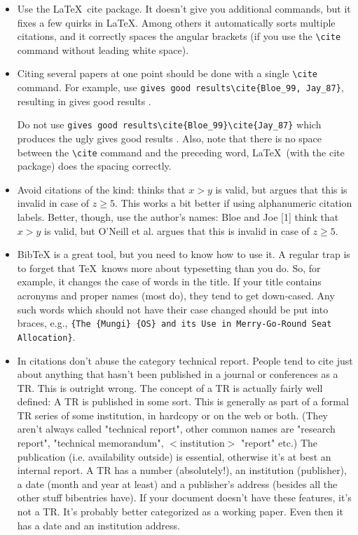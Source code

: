 \documentclass[a4paper,twoside, openright,12pt]{report}
\begin{document}
\begin{itemize}
\item Use the \LaTeX~cite package. It doesn't give you additional commands, but it fixes a few quirks in \LaTeX. Among others it automatically sorts multiple citations, and it correctly spaces the angular brackets (if you use the \verb|\cite| command without leading white space).

\item Citing several papers at one point should be done with a single \verb|\cite| command. For example, use \verb|gives good results\cite{Bloe_99, Jay_87}|, resulting in gives good results \cite{Bloe_99, Jay_87}. 

Do not use \verb|gives good results\cite{Bloe_99}\cite{Jay_87}| which produces the ugly gives good results \cite{Bloe_99}\cite{Jay_87}. Also, note that there is no space between the \verb|\cite| command and the preceding word, \LaTeX~(with the cite package) does the spacing correctly.


\item Avoid citations of the kind: \cite{Bloe_99} thinks that $x>y$ is valid, but \cite{ONeill_2000} argues that this is invalid in case of $z\geq5$. This works a bit better if using alphanumeric citation labels. Better, though, use the author's names: Bloe and Joe [1] think that $x>y$ is valid, but O'Neill et al. \cite{ONeill_2000} argues that this is invalid in case of $z\geq5$. 


\item BibTeX is a great tool, but you need to know how to use it. A regular trap is to forget that \TeX~knows more about typesetting than you do. So, for example, it changes the case of words in the title. If your title contains acronyms and proper names (most do), they tend to get down-cased. Any such words which should not have their case changed should be put into braces, e.g., \verb|{The {Mungi} {OS} and its Use in Merry-Go-Round Seat Allocation}|.


\item In citations don't abuse the category technical report. People tend to cite just about anything that hasn't been published in a journal or conferences as a TR. This is outright wrong. The concept of a TR is actually fairly well defined: A TR is published in some sort. This is generally as part of a formal TR series of some institution, in hardcopy or on the web or both. (They aren't always called "technical report", other common names are "research report", "technical memorandum", $<$institution$>$ "report" etc.) The publication (i.e. availability outside) is essential, otherwise it's at best an internal report.
A TR has a number (absolutely!), an institution (publisher), a date (month and year at least) and a publisher's address (besides all the other stuff bibentries have).
If your document doesn't have these features, it's not a TR. It's probably better categorized as a working paper. Even then it has a date and an institution address.


\end{itemize}
\end{document}
